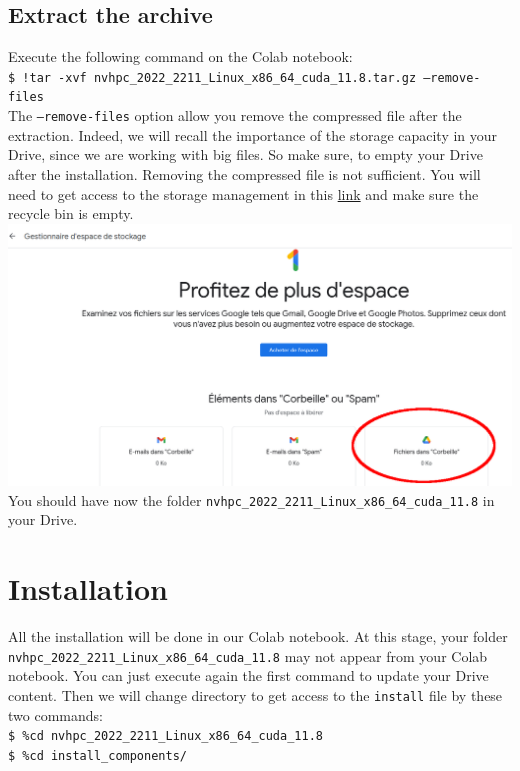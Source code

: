 \documentclass[10pt,a4paper]{article}
\newcommand{\code}[1]{\colorbox{light-gray}{\texttt{#1}}}
\begin{document}
\subsection{Extract the archive}
Execute the following command on the Colab notebook:\\
\code{\$ !tar -xvf nvhpc\_2022\_2211\_Linux\_x86\_64\_cuda\_11.8.tar.gz --remove-files} \\
The  \code{--remove-files} option allow you remove the compressed file after the extraction. Indeed, we will recall the importance of the storage capacity in your Drive, since we are working with big files. So make sure, to empty your Drive after the installation. Removing the compressed file is not sufficient. You will need to get access to the storage management in this \href{https:\/\/one.google.com\/storage\/management}{link} and make sure the recycle bin is empty.\\
\includegraphics[scale=0.3]{freestorage.png}\\
You should have now the folder \code{nvhpc\_2022\_2211\_Linux\_x86\_64\_cuda\_11.8} in your Drive.

\section{Installation}
All the installation  will be done in our Colab notebook. At this stage, your folder \code{nvhpc\_2022\_2211\_Linux\_x86\_64\_cuda\_11.8} may not appear from your Colab notebook. You can just execute again the first command to update your Drive content. Then we will change directory to get access to the \code{install} file by these two commands:\\
\code{\$ \%cd nvhpc\_2022\_2211\_Linux\_x86\_64\_cuda\_11.8}\\
\code{\$ \%cd install\_components/}\\
\end{document}
